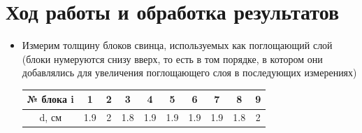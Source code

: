 \documentclass[a4paper,12pt]{article} %
\begin{document}
\section{Ход работы и обработка результатов}
\begin{itemize}
    \item Измерим толщину блоков свинца, используемых как поглощающий слой (блоки нумеруются снизу вверх, то есть в том порядке, в котором они добавлялись для увеличения поглощающего слоя в последующих измерениях) \\
\begin{table}[h!]
\centering
\begin{tabular}{|c|c|c|c|c|c|c|c|c|c|}
\hline
№ блока i & 1 & 2 & 3 & 4 & 5 & 6 & 7 & 8 & 9 \\ \hline
d, см & 1.9 & 2 & 1.8 & 1.9 & 1.9 & 1.9 & 1.9 & 1.8 & 2 \\ \hline
\end{tabular}
\end{table}


\end{itemize}
\end{document}
